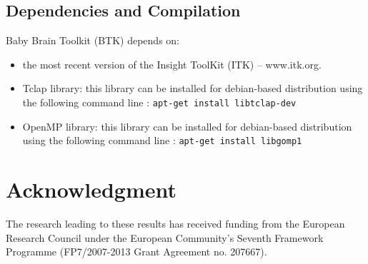 \documentclass[a4paper,10pt]{article}
\begin{document}
\subsection{Dependencies and Compilation}
Baby Brain Toolkit (BTK) depends on:
\begin{itemize}
 \item the most recent version of the Insight ToolKit (ITK) -- www.itk.org. 
 \item Tclap library: this library can be installed for debian-based distribution using the following command line : \texttt{apt-get install libtclap-dev}
 \item OpenMP library: this library can be installed for debian-based distribution using the following command line : \texttt{apt-get install libgomp1}
\end{itemize}






\section*{Acknowledgment}
\small{The research leading to these results has received funding from the European Research Council under the European Community’s Seventh Framework Programme (FP7/2007-2013 Grant Agreement no. 207667).}
\end{document}
